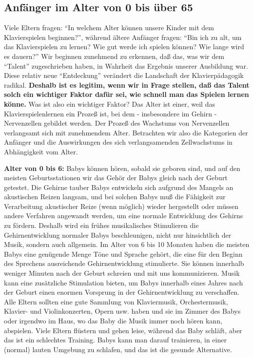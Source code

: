 \subsection{Anfänger im Alter von 0 bis über 65}\hypertarget{c1iii18c}{}

Viele Eltern fragen: \enquote{In welchem Alter können unsere Kinder mit dem Klavierspielen beginnen?},
während ältere Anfänger fragen: \enquote{Bin ich zu alt, um das Klavierspielen zu lernen?
Wie gut werde ich spielen können?
Wie lange wird es dauern?}
Wir beginnen zunehmend zu erkennen, daß das, was wir dem \enquote{Talent} zugeschrieben haben, in Wahrheit das Ergebnis unserer Ausbildung war.
Diese relativ neue \enquote{Entdeckung} verändert die Landschaft der Klavierpädagogik radikal.
\textbf{Deshalb ist es legitim, wenn wir in Frage stellen, daß das Talent solch ein wichtiger Faktor dafür sei, wie schnell man das Spielen lernen könne.}
Was ist also ein wichtiger Faktor?
Das Alter ist einer, weil das Klavierspielenlernen ein Prozeß ist, bei dem - insbesondere im Gehirn - Nervenzellen gebildet werden.
Der Prozeß des Wachstums von Nervenzellen verlangsamt sich mit zunehmendem Alter.
Betrachten wir also die Kategorien der Anfänger und die Auswirkungen des sich verlangsamenden Zellwachstums in Abhängigkeit vom Alter.


\hypertarget{c1iii18c0}{}

\textbf{Alter von 0 bis 6:} Babys können hören, sobald sie geboren sind, und auf den meisten Geburtsstationen wir das Gehör der Babys gleich nach der Geburt getestet.
Die Gehirne tauber Babys entwickeln sich aufgrund des Mangels an akustischen Reizen langsam, und bei solchen Babys muß die Fähigkeit zur Verarbeitung akustischer Reize (wenn möglich) wieder hergestellt oder müssen andere Verfahren angewandt werden, um eine normale Entwicklung des Gehirns zu fördern.
Deshalb wird ein frühes musikalisches Stimulieren die Gehirnentwicklung normaler Babys beschleunigen, nicht nur hinsichtlich der Musik, sondern auch allgemein.
Im Alter von 6 bis 10 Monaten haben die meisten Babys eine genügende Menge Töne und Sprache gehört, die eine für den Beginn des Sprechens ausreichende Gehirnentwicklung stimulierte.
Sie können innerhalb weniger Minuten nach der Geburt schreien und mit uns kommunizieren.
Musik kann eine zusätzliche Stimulation bieten, um Babys innerhalb eines Jahres nach der Geburt einen enormen Vorsprung in der Gehirnentwicklung zu verschaffen.
Alle Eltern sollten eine gute Sammlung von Klaviermusik, Orchestermusik, Klavier- und Violinkonzerten, Opern usw. haben und sie im Zimmer des Babys oder irgendwo im Haus, wo das Baby die Musik immer noch hören kann, abspielen.
Viele Eltern flüstern und gehen leise, während das Baby schläft, aber das ist ein schlechtes Training.
Babys kann man darauf trainieren, in einer (normal) lauten Umgebung zu schlafen, und das ist die gesunde Alternative.

